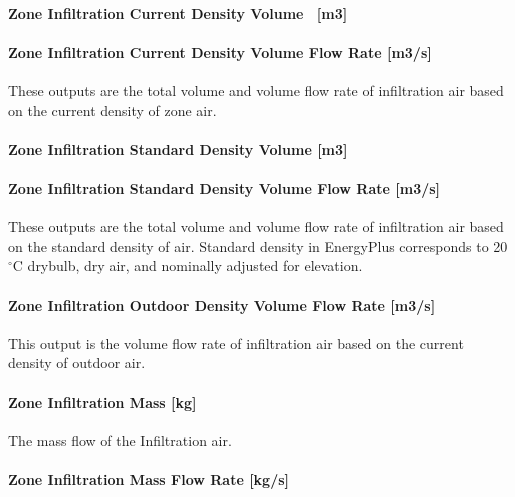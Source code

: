 \paragraph{Zone Infiltration Current Density Volume~ {[}m3{]}}\label{zone-infiltration-current-density-volume-m3}

\paragraph{Zone Infiltration Current Density Volume Flow Rate {[}m3/s{]}}\label{zone-infiltration-current-density-volume-flow-rate-m3s}

These outputs are the total volume and volume flow rate of infiltration air based on the current density of zone air.

\paragraph{Zone Infiltration Standard Density Volume {[}m3{]}}\label{zone-infiltration-standard-density-volume-m3}

\paragraph{Zone Infiltration Standard Density Volume Flow Rate {[}m3/s{]}}\label{zone-infiltration-standard-density-volume-flow-rate-m3s}

These outputs are the total volume and volume flow rate of infiltration air based on the standard density of air. Standard density in EnergyPlus corresponds to 20$^\circ$C drybulb, dry air, and nominally adjusted for elevation.

\paragraph{Zone Infiltration Outdoor Density Volume Flow Rate {[}m3/s{]}}\label{zone-infiltration-outdoor-density-volume-flow-rate-m3s}

This output is the volume flow rate of infiltration air based on the current density of outdoor air.

\paragraph{Zone Infiltration Mass {[}kg{]}}\label{zone-infiltration-mass-kg}

The mass flow of the Infiltration air.

\paragraph{Zone Infiltration Mass Flow Rate {[}kg/s{]}}\label{zone-infiltration-mass-flow-rate-kgs}

